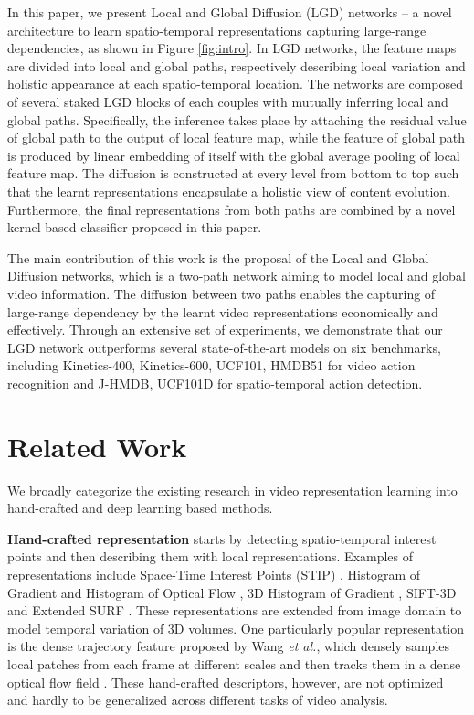 \documentclass[10pt,twocolumn,letterpaper]{article}
\begin{document}
In this paper, we present Local and Global Diffusion (LGD) networks -- a novel architecture to learn spatio-temporal representations capturing large-range dependencies, as shown in Figure \ref{fig:intro}. In LGD networks, the feature maps are divided into local and global paths, respectively describing local variation and holistic appearance at each spatio-temporal location. The networks are composed of several staked LGD blocks of each couples with mutually inferring local and global paths. Specifically, the inference takes place by attaching the residual value of global path to the output of local feature map, while the feature of global path is produced by linear embedding of itself with the global average pooling of local feature map. The diffusion is constructed at every level from bottom to top such that the learnt representations encapsulate a holistic view of content evolution. Furthermore, the final representations from both paths are combined by a novel kernel-based classifier proposed in this paper.

The main contribution of this work is the proposal of the Local and Global Diffusion networks, which is a two-path network aiming to model local and global video information. The diffusion between two paths enables the capturing of large-range dependency by the learnt video representations economically and effectively. Through an extensive set of experiments, we demonstrate that our LGD network outperforms several state-of-the-art models on six benchmarks, including Kinetics-400, Kinetics-600, UCF101, HMDB51 for video action recognition and J-HMDB, UCF101D for spatio-temporal action detection.

\section{Related Work}
We broadly categorize the existing research in video representation learning into hand-crafted and deep learning based methods.

\textbf{Hand-crafted representation} starts by detecting spatio-temporal interest points and then describing them with local representations. Examples of representations include Space-Time Interest Points (STIP) \cite{laptev2005space}, Histogram of Gradient and Histogram of Optical Flow \cite{laptev2008learning}, 3D Histogram of Gradient \cite{klaser2008spatio}, SIFT-3D \cite{scovanner20073} and Extended SURF \cite{willems2008efficient}. These representations are extended from image domain to model temporal variation of 3D volumes. One particularly popular representation is the dense trajectory feature proposed by Wang \emph{et al.}, which densely samples local patches from each frame at different scales and then tracks them in a dense optical flow field \cite{wang2013action}. These hand-crafted descriptors, however, are not optimized and hardly to be generalized across different tasks of video analysis.
\end{document}
